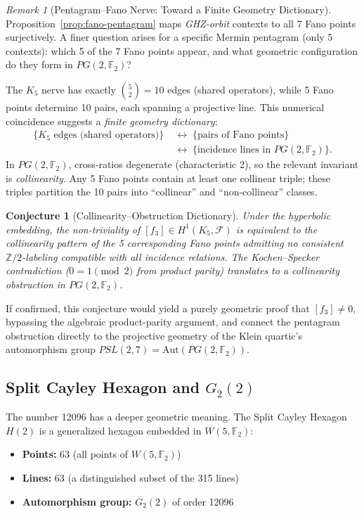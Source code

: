 \documentclass[11pt,a4paper]{article}
\newtheorem{conjecture}[theorem]{Conjecture}
\theoremstyle{remark}
\newtheorem{remark}[theorem]{Remark}
\newcommand{\Z}{\mathbb{Z}}
\newcommand{\F}{\mathbb{F}}
\newcommand{\cF}{\mathcal{F}}
\begin{document}
\begin{remark}[Pentagram--Fano Nerve: Toward a Finite Geometry Dictionary]
\label{rem:nerve-fano-open}
Proposition~\ref{prop:fano-pentagram} maps \emph{GHZ-orbit} contexts
to all 7 Fano points surjectively. A finer question arises for a
specific Mermin pentagram (only 5 contexts): which 5 of the 7 Fano
points appear, and what geometric configuration do they form in
$PG(2, \F_2)$?

The $K_5$ nerve has exactly $\binom{5}{2} = 10$ edges (shared operators),
while 5 Fano points determine 10 pairs, each spanning a projective line.
This numerical coincidence suggests a \emph{finite geometry dictionary}:
\[
\begin{aligned}
\{K_5 \text{ edges (shared operators)}\}
&\;\longleftrightarrow\;
\{\text{pairs of Fano points}\} \\
&\;\longleftrightarrow\;
\{\text{incidence lines in } PG(2, \F_2)\}.
\end{aligned}
\]
In $PG(2, \F_2)$, cross-ratios degenerate (characteristic 2), so the
relevant invariant is \emph{collinearity}. Any 5 Fano points contain at
least one collinear triple; these triples partition the 10 pairs into
``collinear'' and ``non-collinear'' classes.

\begin{conjecture}[Collinearity--Obstruction Dictionary]
\label{conj:collinearity-obstruction}
Under the hyperbolic embedding, the non-triviality of
$[f_3] \in H^1(K_5, \cF)$ is equivalent to the collinearity
pattern of the 5 corresponding Fano points admitting no consistent
$\Z/2$-labeling compatible with all incidence relations. The
Kochen--Specker contradiction ($0 = 1 \pmod 2$ from product parity)
translates to a collinearity obstruction in $PG(2, \F_2)$.
\end{conjecture}

If confirmed, this conjecture would yield a purely geometric proof that
$[f_3] \neq 0$, bypassing the algebraic product-parity argument, and
connect the pentagram obstruction directly to the projective geometry of
the Klein quartic's automorphism group $PSL(2, 7) = \mathrm{Aut}(PG(2,\F_2))$.
\end{remark}

\subsection{Split Cayley Hexagon and $G_2(2)$}
\label{sec:cayley-hexagon}

The number 12096 has a deeper geometric meaning. The Split Cayley
Hexagon $H(2)$ is a generalized hexagon embedded in $W(5, \F_2)$:
\begin{itemize}
  \item \textbf{Points:} 63 (all points of $W(5, \F_2)$)
  \item \textbf{Lines:} 63 (a distinguished subset of the 315 lines)
  \item \textbf{Automorphism group:} $G_2(2)$ of order 12096
\end{itemize}
\end{document}
